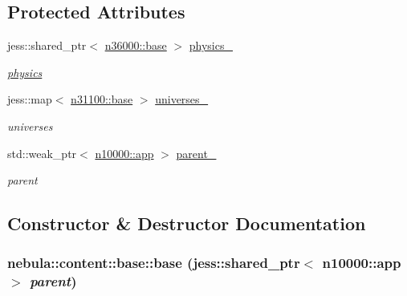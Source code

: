 \subsection*{Protected Attributes}
\begin{DoxyCompactItemize}
\item 
jess::shared\_\-ptr$<$ \hyperlink{classnebula_1_1content_1_1physics_1_1base}{n36000::base} $>$ \hyperlink{classnebula_1_1content_1_1base_af90e41b1076f7ebcba28e330e7193616}{physics\_\-}
\begin{DoxyCompactList}\small\item\em \hyperlink{namespacenebula_1_1content_1_1physics}{physics} \item\end{DoxyCompactList}\item 
jess::map$<$ \hyperlink{classnebula_1_1content_1_1universe_1_1admin_1_1base}{n31100::base} $>$ \hyperlink{classnebula_1_1content_1_1base_aabc7b7583feb3bf497d161d67f2f908e}{universes\_\-}
\begin{DoxyCompactList}\small\item\em universes \item\end{DoxyCompactList}\item 
std::weak\_\-ptr$<$ \hyperlink{classnebula_1_1framework_1_1app}{n10000::app} $>$ \hyperlink{classnebula_1_1content_1_1base_ab7f8a88f261f696ea47b1b6573181754}{parent\_\-}
\begin{DoxyCompactList}\small\item\em parent \item\end{DoxyCompactList}\end{DoxyCompactItemize}


\subsection{Constructor \& Destructor Documentation}
\hypertarget{classnebula_1_1content_1_1base_a32215d003add862cb1cf255aca714006}{
\subsubsection[{base}]{\setlength{\rightskip}{0pt plus 5cm}nebula::content::base::base (jess::shared\_\-ptr$<$ {\bf n10000::app} $>$ {\em parent})}}
\label{classnebula_1_1content_1_1base_a32215d003add862cb1cf255aca714006}



